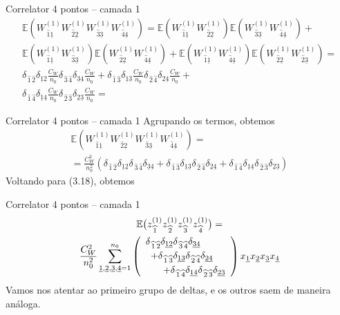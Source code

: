 \documentclass{beamer}
\newcommand{\EE}{\mathbb{E}}
\def\mi#1{{\,\widehat{#1}}}
\def\mj#1{\underline{#1}}
\begin{document}
\begin{frame}{Correlator 4 pontos -- camada 1}
	\small
	\begin{multline*}
		\EE\left(W^{(1)}_{\mi1\mj1}W^{(1)}_{\mi2\mj2}W^{(1)}_{\mi3\mj3}W^{(1)}_{\mi4\mj4}\right) = 
		\EE\left(W^{(1)}_{\mi1\mj1}W^{(1)}_{\mi2\mj2}\right)\EE\left(W^{(1)}_{\mi3\mj3}W^{(1)}_{\mi4\mj4}\right) + \\[1mm]
		\EE\left(W^{(1)}_{\mi1\mj1}W^{(1)}_{\mi3\mj3}\right)\EE\left(W^{(1)}_{\mi2\mj2}W^{(1)}_{\mi4\mj4}\right) + 	
		\EE\left(W^{(1)}_{\mi1\mj1}W^{(1)}_{\mi4\mj4}\right)\EE\left(W^{(1)}_{\mi2\mj2}W^{(1)}_{\mi2\mj3}\right) = \\[1mm]
		\delta_{\mi1\mi2}\delta_{\mj1\mj2}\frac{C_W}{n_0}\delta_{\mi3\mi4}\delta_{\mj3\mj4}\frac{C_W}{n_0} + 
		\delta_{\mi1\mi3}\delta_{\mj1\mj3}\frac{C_W}{n_0}\delta_{\mi2\mi4}\delta_{\mj2\mj4}\frac{C_W}{n_0} + \\
		 \delta_{\mi1\mi4}\delta_{\mj1\mj4}\frac{C_W}{n_0}\delta_{\mi2\mi3}\delta_{\mj2\mj3}\frac{C_W}{n_0} =
	\end{multline*}
\end{frame}
\begin{frame}{Correlator 4 pontos -- camada 1}
	Agrupando os termos, obtemos
	\begin{multline*}
		\EE\left(W^{(1)}_{\mi1\mj1}W^{(1)}_{\mi2\mj2}W^{(1)}_{\mi3\mj3}W^{(1)}_{\mi4\mj4}\right) =\\= \frac{C_W^2}{n_0^2}\left(\delta_{\mi1\mi2}\delta_{\mj1\mj2}\delta_{\mi3\mi4}\delta_{\mj3\mj4} + \delta_{\mi1\mi3}\delta_{\mj1\mj3} \delta_{\mi2\mi4}\delta_{\mj2\mj4} + \delta_{\mi1\mi4}\delta_{\mj1\mj4} \delta_{\mi2\mi3}\delta_{\mj2\mj3}\right)
	\end{multline*}
	Voltando para (3.18), obtemos
\end{frame}
\begin{frame}{Correlator 4 pontos -- camada 1}\small
	\begin{multline*}
		\EE\big(z^{(1)}_{\mi1} z^{(1)}_{\mi2} z^{(1)}_{\mi3} z^{(1)}_{\mi4}\big) = \\
		\frac{C_W^2}{n_0^2}\sum_{\mj1,\mj2,\mj3,\mj4=1}^{n_0} 
		\left(\begin{array}{r}
			\delta_{\mi1\mi2}\delta_{\mj1\mj2}\delta_{\mi3\mi4}\delta_{\mj3\mj4} \hspace{6ex} \\[1mm] 
			+\delta_{\mi1\mi3}\delta_{\mj1\mj3} \delta_{\mi2\mi4}\delta_{\mj2\mj4} \hspace{3ex} \\[1mm]
			+  \delta_{\mi1\mi4}\delta_{\mj1\mj4} \delta_{\mi2\mi3}\delta_{\mj2\mj3}
		\end{array}\right)
		x_{\mj1}x_{\mj2}x_{\mj3}x_{\mj4}
	\end{multline*}
	Vamos nos atentar ao primeiro grupo de deltas, e os outros saem de maneira análoga.
\end{frame}
\end{document}
